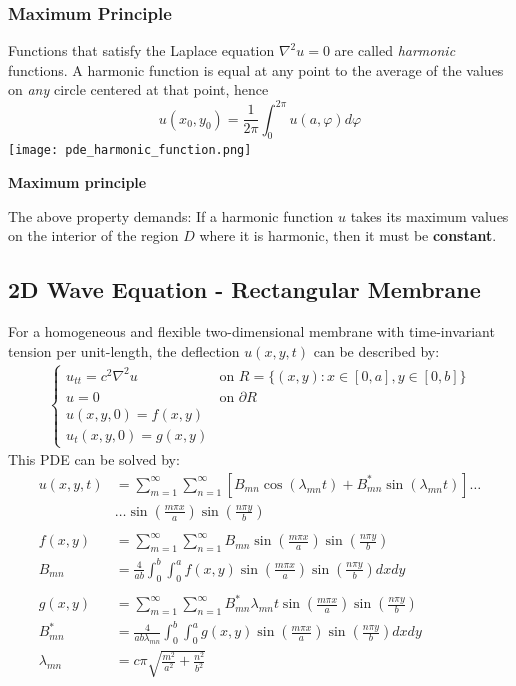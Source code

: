 \subsubsection{Maximum Principle}
Functions that satisfy the Laplace equation $\nabla^2 u=0$ are called \textit{harmonic} functions. A harmonic function is equal at any point to the average of the values on \textit{any} circle centered at that point, hence
\begin{equation*}
    u(x_0, y_0)=\frac{1}{2\pi}\int_{0}^{2\pi}u(a,\varphi)d\varphi
\end{equation*}
\texttt{[image: pde\_harmonic\_function.png]}

\textbf{Maximum principle}

The above property demands: If a harmonic function $u$ takes its maximum values on the interior of the region $D$ where it is harmonic, then it must be \textbf{constant}.


\subsection{2D Wave Equation - Rectangular Membrane}\label{ssec:2d_wave_rect}
For a homogeneous and flexible two-dimensional membrane with time-invariant tension per unit-length,
the deflection $u(x,y,t)$ can be described by:
\begin{align*}
    \begin{cases}
        u_{tt}=c^2\nabla^2u & \text{on }R=\{(x,y):x\in[0,a],y\in[0,b]\} \\
        u=0                 & \text{on }\partial R                      \\
        u(x,y,0)=f(x,y)                                                 \\
        u_t(x,y,0)=g(x,y)
    \end{cases}
\end{align*}
This PDE can be solved by:
\begin{align*}
    u(x,y,t)     & =\sum_{m=1}^{\infty}\sum_{n=1}^{\infty}\left[B_{mn}\cos(\lambda_{mn}t)+B_{mn}^{*}\sin(\lambda_{mn}t)\right]\dots
    \\&\dots \sin\left(\frac{m\pi x}{a}\right)\sin\left(\frac{n\pi y}{b}\right)\\\\
    f(x,y)       & =\sum_{m=1}^{\infty}\sum_{n=1}^{\infty}B_{mn}\sin\left(\frac{m\pi x}a\right)\sin\left(\frac{n\pi y}b\right)             \\
    B_{mn}       & = \frac4{ab}\int_0^b\int_0^{a}f(x,y)\sin\left(\frac{m\pi x}a\right)\sin\left(\frac{n\pi y}b\right)dxdy                  \\\\
    g(x,y)       & =\sum_{m=1}^\infty\sum_{n=1}^\infty B_{mn}^*\lambda_{mn}t\sin\left(\frac{m\pi x}a\right)\sin\left(\frac{n\pi y}b\right) \\
    B_{mn}^{*}   & =\frac4{ab\lambda_{mn}}\int_{0}^{b}\int_{0}^{a}g(x,y)\sin\left(\frac{m\pi x}a\right)\sin\left(\frac{n\pi y}b\right)dxdy \\
    \lambda_{mn} & = c\pi\sqrt{\frac{m^2}{a^2}+\frac{n^2}{b^2}}
\end{align*}

